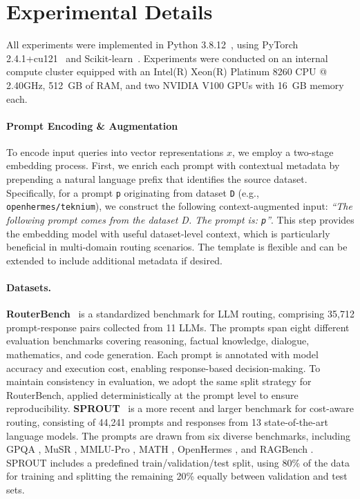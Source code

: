 \documentclass{article}
\theoremstyle{remark}
\begin{document}
\section{Experimental Details}\label{app:hyperparams}

All experiments were implemented in Python 3.8.12~\cite{python}, using PyTorch 2.4.1+cu121~\cite{NEURIPS2019_9015} and Scikit-learn~\cite{sklearn_api}. Experiments were conducted on an internal compute cluster equipped with an Intel(R) Xeon(R) Platinum 8260 CPU @ 2.40GHz, 512~GB of RAM, and two NVIDIA V100 GPUs with 16~GB memory each.

\paragraph{Prompt Encoding \& Augmentation} To encode input queries into vector representations \(x\), we employ a two-stage embedding process. First, we enrich each prompt with contextual metadata by prepending a natural language prefix that identifies the source dataset. Specifically, for a prompt \texttt{p} originating from dataset \texttt{D} (e.g., \texttt{openhermes/teknium}), we construct the following context-augmented input: \textit{``The following prompt comes from the dataset D. The prompt is: \texttt{p}''}. This step provides the embedding model with useful dataset-level context, which is particularly beneficial in multi-domain routing scenarios. The template is flexible and can be extended to include additional metadata if desired.

\paragraph{Datasets.} %

\textbf{RouterBench}~\citep{hu2024routerbench} is a standardized benchmark for LLM routing, comprising 35,712 prompt-response pairs collected from 11 LLMs. The prompts span eight different evaluation benchmarks covering reasoning, factual knowledge, dialogue, mathematics, and code generation. Each prompt is annotated with model accuracy and execution cost, enabling response-based decision-making. To maintain consistency in evaluation, we adopt the same split strategy for RouterBench, applied deterministically at the prompt level to ensure reproducibility. \textbf{SPROUT}~\citep{somerstep2025carrot} is a more recent and larger benchmark for cost-aware routing, consisting of 44,241 prompts and responses from 13 state-of-the-art language models. The prompts are drawn from six diverse benchmarks, including GPQA \citep{rein2024gpqa}, MuSR \citep{sprague2023musr}, MMLU-Pro \citep{wang2024mmlu}, MATH \citep{hendrycks2021measuring}, OpenHermes \citep{teknium2023openhermes}, and RAGBench \citep{friel2407ragbench}. SPROUT includes a predefined train/validation/test split, using 80\% of the data for training and splitting the remaining 20\% equally between validation and test sets.
\end{document}

